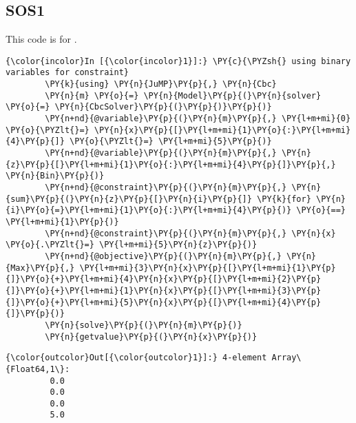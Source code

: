 
\subsection{SOS1}
This code is for .
\label{code:SOS1}

    \begin{Verbatim}[commandchars=\\\{\}]
{\color{incolor}In [{\color{incolor}1}]:} \PY{c}{\PYZsh{} using binary variables for constraint}
        \PY{k}{using} \PY{n}{JuMP}\PY{p}{,} \PY{n}{Cbc}
        \PY{n}{m} \PY{o}{=} \PY{n}{Model}\PY{p}{(}\PY{n}{solver} \PY{o}{=} \PY{n}{CbcSolver}\PY{p}{(}\PY{p}{)}\PY{p}{)}
        \PY{n+nd}{@variable}\PY{p}{(}\PY{n}{m}\PY{p}{,} \PY{l+m+mi}{0} \PY{o}{\PYZlt{}=} \PY{n}{x}\PY{p}{[}\PY{l+m+mi}{1}\PY{o}{:}\PY{l+m+mi}{4}\PY{p}{]} \PY{o}{\PYZlt{}=} \PY{l+m+mi}{5}\PY{p}{)}
        \PY{n+nd}{@variable}\PY{p}{(}\PY{n}{m}\PY{p}{,} \PY{n}{z}\PY{p}{[}\PY{l+m+mi}{1}\PY{o}{:}\PY{l+m+mi}{4}\PY{p}{]}\PY{p}{,} \PY{n}{Bin}\PY{p}{)}
        \PY{n+nd}{@constraint}\PY{p}{(}\PY{n}{m}\PY{p}{,} \PY{n}{sum}\PY{p}{(}\PY{n}{z}\PY{p}{[}\PY{n}{i}\PY{p}{]} \PY{k}{for} \PY{n}{i}\PY{o}{=}\PY{l+m+mi}{1}\PY{o}{:}\PY{l+m+mi}{4}\PY{p}{)} \PY{o}{==} \PY{l+m+mi}{1}\PY{p}{)}
        \PY{n+nd}{@constraint}\PY{p}{(}\PY{n}{m}\PY{p}{,} \PY{n}{x} \PY{o}{.\PYZlt{}=} \PY{l+m+mi}{5}\PY{n}{z}\PY{p}{)}
        \PY{n+nd}{@objective}\PY{p}{(}\PY{n}{m}\PY{p}{,} \PY{n}{Max}\PY{p}{,} \PY{l+m+mi}{3}\PY{n}{x}\PY{p}{[}\PY{l+m+mi}{1}\PY{p}{]}\PY{o}{+}\PY{l+m+mi}{4}\PY{n}{x}\PY{p}{[}\PY{l+m+mi}{2}\PY{p}{]}\PY{o}{+}\PY{l+m+mi}{1}\PY{n}{x}\PY{p}{[}\PY{l+m+mi}{3}\PY{p}{]}\PY{o}{+}\PY{l+m+mi}{5}\PY{n}{x}\PY{p}{[}\PY{l+m+mi}{4}\PY{p}{]}\PY{p}{)}
        \PY{n}{solve}\PY{p}{(}\PY{n}{m}\PY{p}{)}
        \PY{n}{getvalue}\PY{p}{(}\PY{n}{x}\PY{p}{)}
\end{Verbatim}


\begin{Verbatim}[commandchars=\\\{\}]
{\color{outcolor}Out[{\color{outcolor}1}]:} 4-element Array\{Float64,1\}:
         0.0
         0.0
         0.0
         5.0
\end{Verbatim}
            
